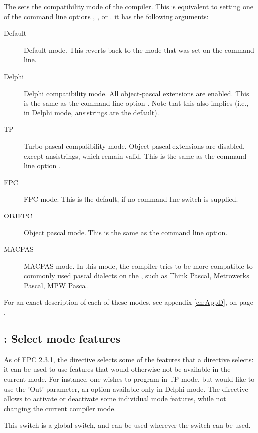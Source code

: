 The  sets the compatibility mode of the compiler. This
is equivalent to setting one of the command line options ,
,  or . it has the following arguments:
\begin{description}
\item[Default] Default mode. This reverts back to the mode that was set on
the command line.
\item[Delphi] Delphi compatibility mode. All object-pascal extensions are
enabled. This is the same as the command line option . Note that
this also implies  (i.e., in Delphi mode, ansistrings are
the default).
\item[TP] Turbo pascal compatibility mode. Object pascal extensions are
disabled, except ansistrings, which remain valid.
This is the same as the command line option .
\item[FPC] FPC mode. This is the default, if no command line switch is
supplied.
\item[OBJFPC] Object pascal mode. This is the same as the 
command line option.
\item[MACPAS] MACPAS mode. In this mode, the compiler tries to be more compatible
to commonly used pascal dialects on the \macos, such as Think Pascal, Metrowerks 
Pascal, MPW Pascal. 
\end{description}

For an exact description of each of these modes, see appendix \ref{ch:AppD},
on page \pageref{ch:AppD}.

\subsection{ : Select mode features}
As of FPC 2.3.1, the  directive selects some of the features that a
 directive selects: it can be used to use features that
would otherwise not be available in the current mode. For instance, one
wishes to program in TP mode, but would like to use the 'Out' parameter,
an option available only in Delphi mode. The 
directive allows to activate or deactivate some individual mode features, 
while not changing the current compiler mode.

This switch is a global switch, and can be used wherever the 
switch can be used.

